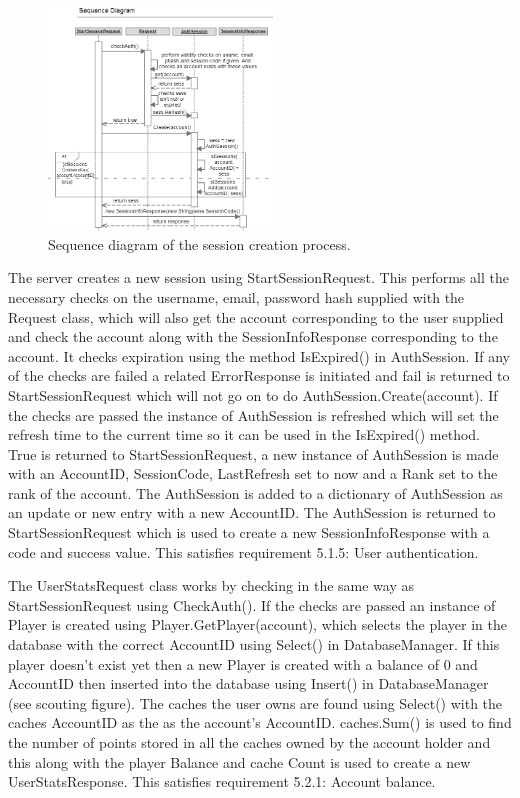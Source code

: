 \begin{figure}
    \includegraphics[width=0.53\textwidth]{images/sequence/createSession}
    \caption{Sequence diagram of the session creation process.}
\end{figure}

The server creates a new session using StartSessionRequest. This performs all the necessary checks on the username, email, password hash supplied with the Request class, which will also get the account corresponding to the user supplied and check the account along with the SessionInfoResponse corresponding to the account. It checks expiration using the method IsExpired() in AuthSession. If any of the checks are failed a related ErrorResponse is initiated and fail is returned to StartSessionRequest which will not go on to do AuthSession.Create(account). If the checks are passed the instance of AuthSession is refreshed which will set the refresh time to the current time so it can be used in the IsExpired() method. True is returned to StartSessionRequest, a new instance of AuthSession is made with an AccountID, SessionCode, LastRefresh set to now and a Rank set to the rank of the account. The AuthSession is added to a dictionary of AuthSession as an update or new entry with a new AccountID. The AuthSession is returned to StartSessionRequest which is used to create a new SessionInfoResponse with a code and success value. This satisfies requirement 5.1.5: User authentication.

The UserStatsRequest class works by checking in the same way as StartSessionRequest using CheckAuth(). If the checks are passed an instance of Player is created using Player.GetPlayer(account), which selects the player in the database with the correct AccountID using Select() in DatabaseManager. If this player doesn't exist yet then a new Player is created with a balance of 0 and AccountID then inserted into the database using Insert() in DatabaseManager (see scouting figure). The caches the user owns are found using Select() with the caches AccountID as the as the account's AccountID. caches.Sum() is used to find the number of points stored in all the caches owned by the account holder and this along with the player Balance and cache Count is used to create a new UserStatsResponse. This satisfies requirement 5.2.1: Account balance.

